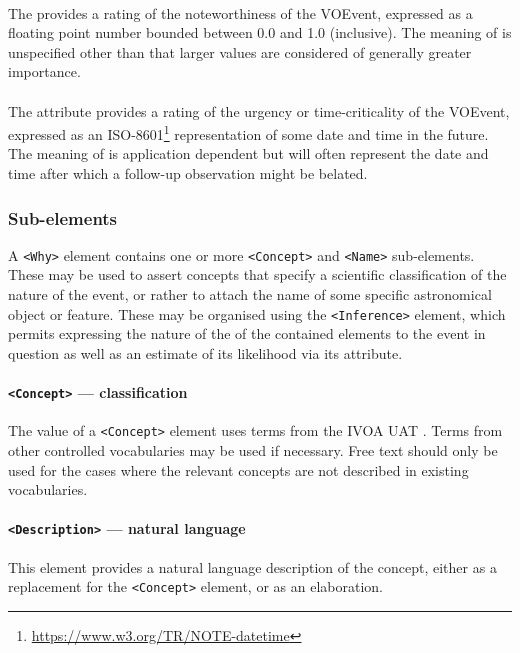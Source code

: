 \documentclass[11pt,a4paper]{ivoa}
\begin{document}
\paragraph{}\label{sec:3.6.1}
The  provides a rating of the noteworthiness of the VOEvent,
expressed as a floating point number bounded between 0.0 and 1.0 (inclusive).
The meaning of  is unspecified other than that larger values are
considered of generally greater importance.

\paragraph{}\label{sec:3.6.2}
The  attribute provides a rating of the urgency or time-criticality
of the VOEvent, expressed as an ISO-8601\footnote{\url{https://www.w3.org/TR/NOTE-datetime}}
representation of some date and time in
the future. The meaning of  is application dependent but will often
represent the date and time after which a follow-up observation might be
belated.

\subsubsection{Sub-elements}
A \verb|<Why>| element contains one or more \verb|<Concept>| and \verb|<Name>|
sub-elements. These may be used to assert concepts that specify a scientific
classification of the nature of the event, or rather to attach the name of some
specific astronomical object or feature. These may be organised using the
\verb|<Inference>| element, which permits expressing the nature of the
of the contained elements to the event in question as well as an estimate of its
likelihood via its  attribute.

\paragraph{\texttt{<Concept>} --- classification}\label{sec:3.6.3}
The value of a \verb|<Concept>| element uses terms from
the IVOA UAT \citep{2022ivoa.spec.0722D}. Terms from other controlled vocabularies
may be used if necessary. Free text should only be used for the cases where the
relevant concepts are not described in existing vocabularies.

\paragraph{\texttt{<Description>} --- natural language}\label{sec:3.6.4}
This element provides a natural language description of the concept, either as
a replacement for the \verb|<Concept>| element, or as an elaboration.
\end{document}
